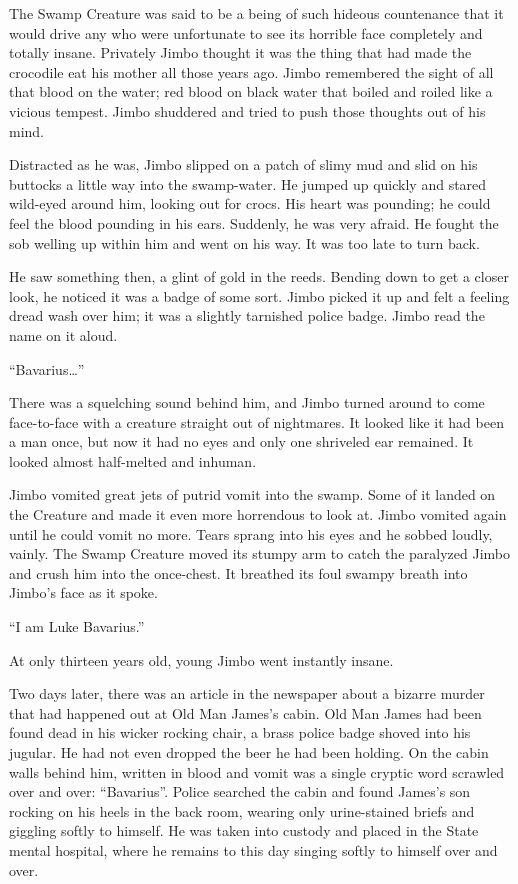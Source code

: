 The Swamp Creature was said to be a being of such hideous
countenance that it would drive any who were unfortunate to see its
horrible face completely and totally insane. Privately Jimbo
thought it was the thing that had made the crocodile eat his mother
all those years ago. Jimbo remembered the sight of all that blood
on the water; red blood on black water that boiled and roiled like
a vicious tempest. Jimbo shuddered and tried to push those thoughts
out of his mind.

Distracted as he was, Jimbo slipped on a patch of slimy mud and
slid on his buttocks a little way into the swamp-water. He jumped
up quickly and stared wild-eyed around him, looking out for crocs.
His heart was pounding; he could feel the blood pounding in his
ears. Suddenly, he was very afraid. He fought the sob welling up
within him and went on his way. It was too late to turn back.

He saw something then, a glint of gold in the reeds. Bending down
to get a closer look, he noticed it was a badge of some sort. Jimbo
picked it up and felt a feeling dread wash over him; it was a
slightly tarnished police badge. Jimbo read the name on it
aloud.

``Bavarius{\ldots}''

There was a squelching sound behind him, and Jimbo turned around to
come face-to-face with a creature straight out of nightmares. It
looked like it had been a man once, but now it had no eyes and only
one shriveled ear remained. It looked almost half-melted and
inhuman.

Jimbo vomited great jets of putrid vomit into the swamp. Some of it
landed on the Creature and made it even more horrendous to look at.
Jimbo vomited again until he could vomit no more. Tears sprang into
his eyes and he sobbed loudly, vainly. The Swamp Creature moved its
stumpy arm to catch the paralyzed Jimbo and crush him into the
once-chest. It breathed its foul swampy breath into Jimbo's
face as it spoke.

``I am Luke Bavarius.''

At only thirteen years old, young Jimbo went instantly
insane.



Two days later, there was an article in the newspaper about a
bizarre murder that had happened out at Old Man James's
cabin. Old Man James had been found dead in his wicker rocking
chair, a brass police badge shoved into his jugular. He had not
even dropped the beer he had been holding. On the cabin walls
behind him, written in blood and vomit was a single cryptic word
scrawled over and over: ``Bavarius''. Police searched the
cabin and found James's son rocking on his heels in the back
room, wearing only urine-stained briefs and giggling softly to
himself. He was taken into custody and placed in the State mental
hospital, where he remains to this day singing softly to himself
over and over.

